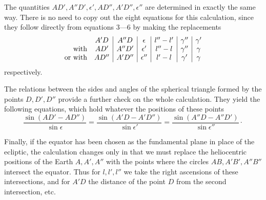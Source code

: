 The quantities $AD',A''D',\epsilon',AD'',A'D'',\epsilon''$ are determined in exactly the same way. There is no need to copy out the
eight equations for this calculation, since they follow directly from equations 3---6 by making
the replacements
\begingroup{}
\[
\begin{array}{r c|c|c|c|c|c}
 & A'D & A''D & \epsilon & l''-l' & \gamma'' & \gamma'\\
\text{with} & AD' & A''D' & \epsilon' & l''-l & \gamma'' & \gamma\\
\text{or with} & AD'' & A'D'' & \epsilon'' & l'-l & \gamma' & \gamma
\end{array}
\]
respectively.\endgroup

The relations between the sides and angles of the spherical triangle formed by the points $D,D',D''$
provide a further check on the whole calculation. They yield the following equations, which hold
whatever the positions of these points
\[
\frac{\sin(AD'-AD'')}{\sin\epsilon}=\frac{\sin(A'D-A'D'')}{\sin\epsilon'}=\frac{\sin(A''D-A''D')}{\sin\epsilon''}\mathpunct{\cdot}
\]

Finally, if the equator has been chosen \hypertarget{native-185}{}as the fundamental plane in place of the ecliptic,
the calculation changes only in that we must replace the heliocentric positions of the Earth
$A,A',A''$ with the points where the circles $AB,A'B',A''B''$ intersect the equator. Thus for $l,l',l''$ we take
the right ascensions of these intersections, and for $A'D$ the distance of the point $D$
from the second intersection, etc.

